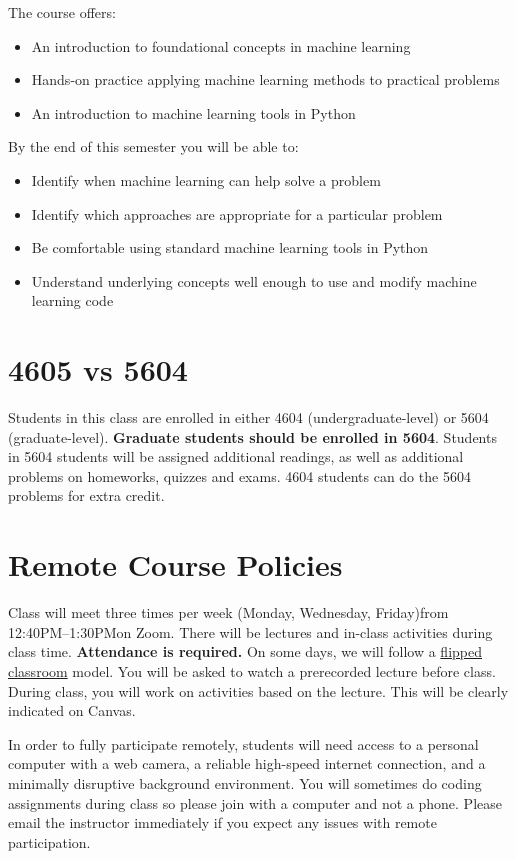 \documentclass[10pt]{memoir}
\def\mymeetingdays{Monday, Wednesday, Friday}
\def\mymeetingtimes{12:40PM--1:30PM}
\begin{document}
The course offers:

\begin{itemize}
\item An introduction to foundational concepts in machine learning
\item Hands-on practice applying machine learning methods to practical problems
\item An introduction to machine learning tools in Python 
\end{itemize}

By the end of this semester you will be able to:
\begin{itemize}
\item Identify when machine learning can help solve a problem
\item Identify which approaches are appropriate for a particular problem
\item Be comfortable using standard machine learning tools in Python
\item Understand underlying concepts well enough to use and modify machine learning code
\end{itemize}

\section{\textbf{4605 vs 5604}}

Students in this class are enrolled in either 4604 (undergraduate-level) or 5604 (graduate-level). \textbf{Graduate students should be enrolled in 5604}. Students in 5604 students will be assigned additional readings, as well as additional problems on homeworks, quizzes and exams. 4604 students can do the 5604 problems for extra credit.

\section{\textbf{Remote Course Policies}}
Class will meet three times per week (\mymeetingdays)\space from \mymeetingtimes\space on Zoom. There will be lectures and in-class activities during class time. \textbf{Attendance is required.} On some days, we will follow a \href{https://en.wikipedia.org/wiki/Flipped_classroom}{flipped classroom} model. You will be asked to watch a prerecorded lecture before class. During class, you will work on activities based on the lecture. This will be clearly indicated on Canvas.
 
In order to fully participate remotely, students will need access to a personal computer with a web camera, a reliable high-speed internet connection, and a minimally disruptive background environment. {You will sometimes do coding assignments during class so please join with a computer and not a phone}. Please email the instructor immediately if you expect any issues with remote participation.
\end{document}
